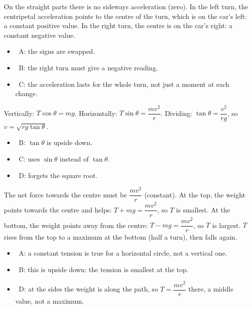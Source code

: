 \documentclass[12pt]{article}
\begin{document}
\begin{practiceanswers}
\begin{practiceans}
  On the straight parts there is no sideways acceleration (zero). In the left turn, the centripetal
  acceleration points to the centre of the turn, which is on the car's left: a constant positive
  value. In the right turn, the centre is on the car's right: a constant negative value.
  \begin{itemize}
    \item \xmark\ A: the signs are swapped.
    \item \xmark\ B: the right turn must give a negative reading.
    \item \xmark\ C: the acceleration lasts for the whole turn, not just a moment at each change.
  \end{itemize}
\end{practiceans}

\begin{practiceans}
  Vertically: $T\cos\theta = mg$. Horizontally: $T\sin\theta = \dfrac{mv^2}{r}$. Dividing:
  $\tan\theta = \dfrac{v^2}{rg}$, so $v = \sqrt{rg\tan\theta}$.
  \begin{itemize}
    \item \xmark\ B: $\tan\theta$ is upside down.
    \item \xmark\ C: uses $\sin\theta$ instead of $\tan\theta$.
    \item \xmark\ D: forgets the square root.
  \end{itemize}
\end{practiceans}

\begin{practiceans}
  The net force towards the centre must be $\dfrac{mv^2}{r}$ (constant). At the top, the weight
  points towards the centre and helps: $T + mg = \dfrac{mv^2}{r}$, so $T$ is smallest. At the
  bottom, the weight points away from the centre: $T - mg = \dfrac{mv^2}{r}$, so $T$ is largest.
  $T$ rises from the top to a maximum at the bottom (half a turn), then falls again.
  \begin{itemize}
    \item \xmark\ A: a constant tension is true for a horizontal circle, not a vertical one.
    \item \xmark\ B: this is upside down: the tension is smallest at the top.
    \item \xmark\ D: at the sides the weight is along the path, so $T = \dfrac{mv^2}{r}$ there, a
          middle value, not a maximum.
  \end{itemize}
\end{practiceans}


\end{practiceanswers}
\end{document}

